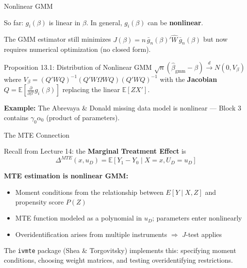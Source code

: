 \documentclass[aspectratio=169, handout, t]{beamer}
\numberwithin{equation}{section}
\begin{document}
\begin{frame}{Nonlinear GMM}

So far: $g_i(\beta)$ is linear in $\beta$. In general, $g_i(\beta)$ can be \textbf{nonlinear}.

\medskip
The GMM estimator still minimizes $J(\beta) = n\,\bar{g}_n(\beta)'\hat W\,\bar{g}_n(\beta)$ but now requires numerical optimization (no closed form).

\medskip
\begin{block}{Proposition 13.1: Distribution of Nonlinear GMM}
$\sqrt{n}(\hat\beta_{\text{gmm}} - \beta) \xrightarrow{d} N(0, V_\beta)$
where $V_\beta = (Q'WQ)^{-1}(Q'W\Omega WQ)(Q'WQ)^{-1}$ with the \textbf{Jacobian}
$Q = \mathbb{E}\!\left[\frac{\partial}{\partial \beta'} g_i(\beta)\right]$
replacing the linear $\mathbb{E}[ZX']$.
\end{block}

\smallskip
\textbf{Example:} The Abrevaya \& Donald missing data model is nonlinear --- Block 3 contains $\gamma_0\alpha_0$ (product of parameters).

\end{frame}

\begin{frame}{The MTE Connection}

Recall from Lecture 14: the \textbf{Marginal Treatment Effect} is
$$\Delta^{MTE}(x, u_D) = \mathbb{E}[Y_1 - Y_0 \mid X = x, U_D = u_D]$$

\medskip
\textbf{MTE estimation is nonlinear GMM:}
\begin{itemize}\itemsep=1pt
\item Moment conditions from the relationship between $E[Y \mid X, Z]$ and propensity score $P(Z)$
\item MTE function modeled as a polynomial in $u_D$; parameters enter nonlinearly
\item Overidentification arises from multiple instruments $\Rightarrow$ $J$-test applies
\end{itemize}

\medskip
The \texttt{ivmte} package (Shea \& Torgovitsky) implements this: specifying moment conditions, choosing weight matrices, and testing overidentifying restrictions.

\end{frame}
\end{document}

